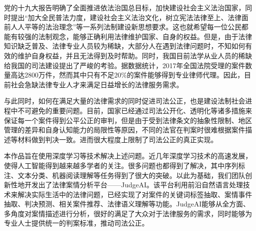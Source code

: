 \begin{cabstract}

  党的十九大报告明确了全面推进依法治国总目标，加快建设社会主义法治国家，同时提出“加大全民普法力度，建设社会主义法治文化，树立宪法法律至上、法律面前人人平等的法治理念”等一系列法制建设新思想要求。这也就希望每一位公民都能有较强的法制观念，能够正确利用法律维护国家、自身的权益。但是，由于法律知识缺乏普及、法律专业人员较为稀缺，大部分人在遇到法律问题时，不知如何有效的维护自身权益，并且无法得到及时帮助。同时，我国目前法学从业人员的稀缺给我国的司法建设提出了严峻的考验。据数据统计，2017年全国法院受理的案件数量高达2800万件，然而其中只有不足20\%的案件能够得到专业律师代理。因此，目前社会急缺法律专业人才来满足日益增长的法律服务需求。
  
	与此同时，如何在满足大量的法律需求的同时促进司法公正，也是建设法制社会进程中不可避免的重要问题。目前，国家已经通过司法公开化、透明化等诸多措施来保证每一个案件得到公平公正的审判，但是由于受到法律条文的抽象性限制、地区管理的差异和自身认知能力的局限性等原因，不同的法官在判案时很难根据案件描述等材料做到判决一致。进而很大程度上限制了司法公正的真正实现。
	
	本作品旨在使用深度学习等技术解决上述问题。近几年深度学习技术的高速发展，使得人工智能得到越来越多学者的关注。很多问题也都得到了解决，其中序列标注、文本分类、机器阅读理解等任务得到了很大的突破。以此为基础，我们团队创新性地开发出了法律案情分析平台——JudgeAI。该平台利用前沿自然语言处理技术来解决实际生活中的法律问题，已经实现了对案件的关键词标签抽取、案情事件抽取、判决预测、相关案件推荐、法律语义理解等功能。JudgeAI能够从全方面、多角度对案情描述进行分析，很好的满足了大众对于法律服务的需求，同时能够为专业人士提供统一的判案标准，推动司法公正。

\end{cabstract}


\begin{eabstract}
	
\end{eabstract}


